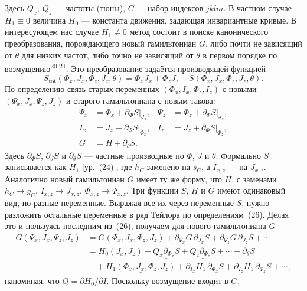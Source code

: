 \documentclass[11pt,a4paper]{article}
\begin{document}
Здесь $Q_x$, $Q_z$ --- частоты (тюны), $C$ --- набор индексов $jklm$. В частном
случае $H_1\equiv 0$ величина $H_0$ --- константа движения, задающая
инвариантные кривые. В интересующем нас случае $H_1\neq 0$ метод состоит в
поиске канонического преобразования, порождающего новый гамильтониан $G$, либо
почти не зависящий от $\theta$ для низких частот, либо точно не зависящий от
$\theta$ в первом порядке по возмущению\textsuperscript{20,21}. Это
преобразование задаётся производящей функцией
\begin{equation}
S_{\mathrm{tot}}(\Phi_x,J_x,\Phi_z,J_z,\theta)
=\Phi_x J_x+\Phi_z J_z+S(\Phi_x,J_x,\Phi_z,J_z,\theta).
\end{equation}
По определению связь старых переменных $(\Phi_x,I_x,\Phi_z,I_z)$ с новыми
$(\Psi_x,J_x,\Psi_z,J_z)$ и старого гамильтониана с новым такова:
\begin{equation}
\begin{aligned}
\Psi_x&=\Phi_x+\partial_{\Phi}S\big|_{J_x},&
\Psi_z&=\Phi_z+\partial_{\Phi}S\big|_{J_z},\\
I_x&=J_x+\partial_{\Phi}S\big|_{\Phi_x},&
I_z&=J_z+\partial_{\Phi}S\big|_{\Phi_z},\\
G&=H+\partial_\theta S.
\end{aligned}
\end{equation}
Здесь $\partial_\Phi S$, $\partial_J S$ и $\partial_\theta S$ --- частные
производные по $\Phi$, $J$ и $\theta$. Формально $S$ записывается как $H_1$
[ур.~(24)], где $h_C$ заменено на $s_C$, а $I_{x,z}$ --- на $J_{x,z}$. Аналогично
новый гамильтониан $G$ имеет ту же форму, что $H$, с заменами $h_C\to g_C$,
$I_{x,z}\to J_{x,z}$, $\Phi_{x,z}\to\Psi_{x,z}$. Три функции $S$, $H$ и $G$ имеют
одинаковый вид, но разные переменные. Выражая все их через переменные $S$, нужно
разложить остальные переменные в ряд Тейлора по определениям~(26). Делая это и
пользуясь последним из~(26), получаем для нового гамильтониана $G$
\begin{align}
G(\Psi_x,J_x,\Psi_z,J_z)
&=G(\Phi_x,J_x,\Phi_z,J_z)
+\partial_{\Psi_x}G\,\partial_{J_x}S
+\partial_{\Psi_z}G\,\partial_{J_z}S+\cdots \nonumber\\
&=\underline{H_0(J_x,J_z)}
+\underline{Q_x\partial_{\Phi_x}S}
+\underline{Q_z\partial_{\Phi_z}S}+\cdots
+\underline{\partial_\theta S}\nonumber\\
&\quad+\underline{H_1(\Phi_x,J_x,\Phi_z,J_z)}
+\partial_{I_x}H_1\,\partial_{\Phi_x}S
+\partial_{I_z}H_1\,\partial_{\Phi_z}S+\cdots,
\end{align}
напоминая, что $Q=\partial H_0/\partial I$. Поскольку возмущение входит в $G$,
\end{document}
